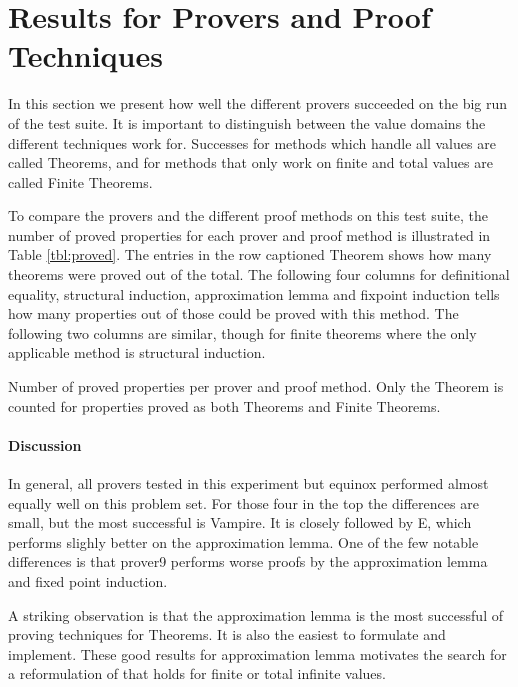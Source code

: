 \section{Results for Provers and Proof Techniques}

In this section we present how well the different provers succeeded on
the big run of the test suite. It is important to distinguish between
the value domains the different techniques work for. Successes for
methods which handle all values are called Theorems, and for methods
that only work on finite and total values are called Finite Theorems.

To compare the provers and the different proof methods on this test
suite, the number of proved properties for each prover and proof
method is illustrated in Table \ref{tbl:proved}. The entries in the
row captioned Theorem shows how many theorems were proved out of the
total. The following four columns for definitional equality,
structural induction, approximation lemma and fixpoint induction tells
how many properties out of those could be proved with this method. The
following two columns are similar, though for finite theorems where the
only applicable method is structural induction.

\begin{table}[h]
\centering

\caption{Number of proved properties per prover and proof method.
         Only the Theorem is counted for properties proved as both
         Theorems and Finite Theorems.
\label{tbl:proved}
}
\end{table}

\paragraph{Discussion}

In general, all provers tested in this experiment but equinox
performed almost equally well on this problem set. For those four in
the top the differences are small, but the most successful is
Vampire. It is closely followed by E, which performs slighly better on
the approximation lemma. One of the few notable differences is that
prover9 performs worse proofs by the approximation lemma and fixed
point induction.

A striking observation is that the approximation lemma is the most
successful of proving techniques for Theorems. It is also the easiest
to formulate and implement. These good results for approximation
lemma motivates the search for a reformulation of that holds for
finite or total infinite values.

